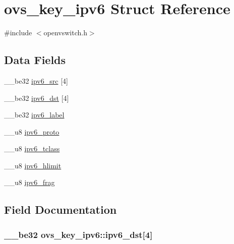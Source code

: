 \hypertarget{structovs__key__ipv6}{}\section{ovs\+\_\+key\+\_\+ipv6 Struct Reference}
\label{structovs__key__ipv6}


{\ttfamily \#include $<$openvswitch.\+h$>$}

\subsection*{Data Fields}
\begin{DoxyCompactItemize}
\item 
\+\_\+\+\_\+be32 \hyperlink{structovs__key__ipv6_ac1ff8dfd6a3b86196c2267b64077517e}{ipv6\+\_\+src} \mbox{[}4\mbox{]}
\item 
\+\_\+\+\_\+be32 \hyperlink{structovs__key__ipv6_a32109125c4fc7b02b01ac84e9af8e447}{ipv6\+\_\+dst} \mbox{[}4\mbox{]}
\item 
\+\_\+\+\_\+be32 \hyperlink{structovs__key__ipv6_a723a1a03d115ebe2a9fdada09e63bd0c}{ipv6\+\_\+label}
\item 
\+\_\+\+\_\+u8 \hyperlink{structovs__key__ipv6_a194ad047677db5a081bdd730b20f8007}{ipv6\+\_\+proto}
\item 
\+\_\+\+\_\+u8 \hyperlink{structovs__key__ipv6_a391295d87ca76a365cc78fd92c4e4615}{ipv6\+\_\+tclass}
\item 
\+\_\+\+\_\+u8 \hyperlink{structovs__key__ipv6_a5273b4aa4bba11f547cfa0687acaaeae}{ipv6\+\_\+hlimit}
\item 
\+\_\+\+\_\+u8 \hyperlink{structovs__key__ipv6_ace1ae2a8c22670bde77abadde9101d27}{ipv6\+\_\+frag}
\end{DoxyCompactItemize}


\subsection{Field Documentation}
\hypertarget{structovs__key__ipv6_a32109125c4fc7b02b01ac84e9af8e447}{}
\subsubsection[{ipv6\+\_\+dst}]{\setlength{\rightskip}{0pt plus 5cm}\+\_\+\+\_\+be32 ovs\+\_\+key\+\_\+ipv6\+::ipv6\+\_\+dst\mbox{[}4\mbox{]}}\label{structovs__key__ipv6_a32109125c4fc7b02b01ac84e9af8e447}
\hypertarget{structovs__key__ipv6_ace1ae2a8c22670bde77abadde9101d27}{}

